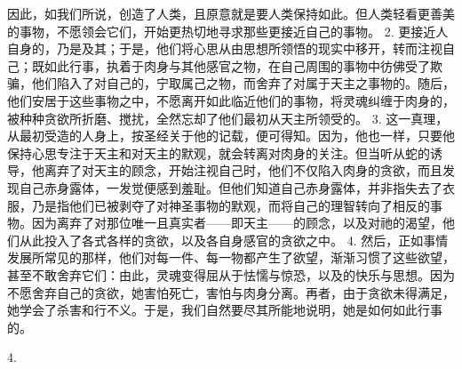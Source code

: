 因此，如我们所说，创造了人类，且原意就是要人类保持如此。但人类轻看更善美的事物，不愿领会它们，开始更热切地寻求那些更接近自己的事物。 2. 更接近人自身的，乃是及其；于是，他们将心思从由思想所领悟的现实中移开，转而注视自己；既如此行事，执着于肉身与其他感官之物，在自己周围的事物中彷佛受了欺骗，他们陷入了对自己的，宁取属己之物，而舍弃了对属于天主之事物的。随后，他们安居于这些事物之中，不愿离开如此临近他们的事物，将灵魂纠缠于肉身的，被种种贪欲所折磨、搅扰，全然忘却了他们最初从天主所领受的。 3. 这一真理，从最初受造的人身上，按圣经关于他的记载，便可得知。因为，他也一样，只要他保持心思专注于天主和对天主的默观，就会转离对肉身的关注。但当听从蛇的诱导，他离弃了对天主的顾念，开始注视自己时，他们不仅陷入肉身的贪欲，而且发现自己赤身露体，一发觉便感到羞耻。但他们知道自己赤身露体，并非指失去了衣服，乃是指他们已被剥夺了对神圣事物的默观，而将自己的理智转向了相反的事物。因为离弃了对那位唯一且真实者——即天主——的顾念，以及对祂的渴望，他们从此投入了各式各样的贪欲，以及各自身感官的贪欲之中。 4. 然后，正如事情发展所常见的那样，他们对每一件、每一物都产生了欲望，渐渐习惯了这些欲望，甚至不敢舍弃它们：由此，灵魂变得屈从于怯懦与惊恐，以及的快乐与思想。因为不愿舍弃自己的贪欲，她害怕死亡，害怕与肉身分离。再者，由于贪欲未得满足，她学会了杀害和行不义。于是，我们自然要尽其所能地说明，她是如何如此行事的。\par

4. \par

